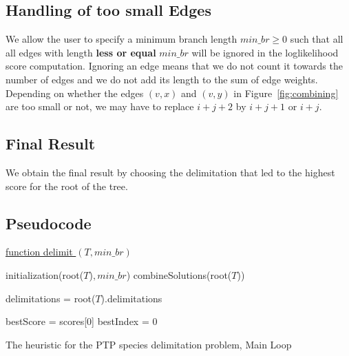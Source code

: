 \documentclass{llncs}
\begin{document}
\subsection{Handling of too small Edges}

We allow the user to specify a minimum branch length $min\_br \geq 0$ such that all all edges with length \textbf{less or equal} $min\_br$ will be ignored in the loglikelihood score computation. Ignoring an edge means that we do not count it towards the number of edges and we do not add its length to the sum of edge weights. Depending on whether the edges $(v,x)$ and $(v,y)$ in Figure~\ref{fig:combining} are too small or not, we may have to replace $i+j+2$ by $i+j+1$ or $i+j$.

\subsection{Final Result}
We obtain the final result by choosing the delimitation that led to the highest score for the root of the tree.

\subsection{Pseudocode}
\begin{algorithm}


\underline{function delimit $(T, min\_br)$}\

initialization(root($T$)$, min\_br$)\;
combineSolutions(root($T$))\;

delimitations = root($T$).delimitations\;

bestScore = scores[0]\;
bestIndex = 0\;



\caption{The heuristic for the PTP species delimitation problem, Main Loop}

\end{algorithm}
\end{document}
